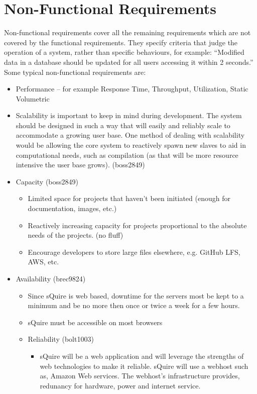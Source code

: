 \documentclass[11pt]{report}
\begin{document}
\section{Non-Functional Requirements}
    Non-functional requirements cover all the remaining requirements which are not covered by the functional requirements. They specify criteria that judge the operation of a system, rather than specific behaviours, for example: ``Modified data in a database should be updated for all users accessing it within 2 seconds.'' Some typical non-functional requirements are:
    \begin{itemize}
        \item Performance – for example Response Time, Throughput, Utilization, Static Volumetric
        \item Scalability is important to keep in mind during development. The system should be designed in such a way that will easily and reliably scale to accommodate a growing user base. One method of dealing with scalability would be allowing the core system to reactively spawn new slaves to aid in computational needs, such as compilation (as that will be more resource intensive the user base grows). (boss2849)
        \item Capacity (boss2849) \begin{itemize}
            \item Limited space for projects that haven't been initiated (enough for documentation, images, etc.)
            \item Reactively increasing capacity for projects proportional to the absolute needs of the projects. (no fluff)
            \item Encourage developers to store large files elsewhere, e.g. GitHub LFS, AWS, etc.
        \end{itemize}
        \item Availability (brec9824) \begin{itemize}
            \item Since sQuire is web based, downtime for the servers most be kept to a minimum and be no more then once or twice a week for a few hours.
            \item sQuire must be accessible on most browsers 
        \item Reliability (bolt1003) \begin{itemize}
            \item sQuire will be a web application and will leverage the strengths of web technologies to make it reliable.       sQuire will use a webhost such as, Amazon Web services. The webhost's infrastructure provides,                 redunancy for hardware, power and internet service.

\end{itemize}
\end{itemize}
\end{itemize}
\end{document}

